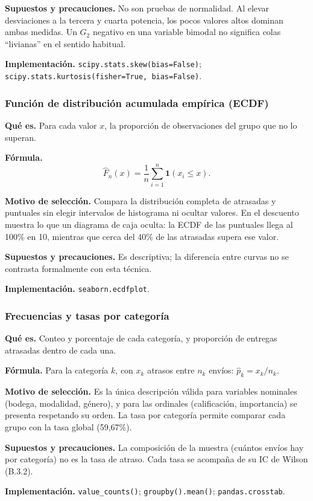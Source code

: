 \documentclass[10pt,a4paper]{article}
\begin{document}
\textbf{Supuestos y precauciones.} No son pruebas de normalidad. Al elevar desviaciones a la tercera y cuarta potencia, los pocos valores altos dominan ambas medidas. Un $G_2$ negativo en una variable bimodal no significa colas ``livianas'' en el sentido habitual.

\textbf{Implementación.} \texttt{scipy.stats.skew(bias=False)}; \texttt{scipy.stats.kurtosis(fisher=True, bias=False)}.

\subsubsection{Función de distribución acumulada empírica (ECDF)}
\textbf{Qué es.} Para cada valor $x$, la proporción de observaciones del grupo que no lo superan.

\textbf{Fórmula.}
\[
\hat F_n(x)=\frac1n\sum_{i=1}^{n}\mathbf 1(x_i\le x).
\]

\textbf{Motivo de selección.} Compara la distribución completa de atrasadas y puntuales sin elegir intervalos de histograma ni ocultar valores. En el descuento muestra lo que un diagrama de caja oculta: la ECDF de las puntuales llega al 100\% en 10, mientras que cerca del 40\% de las atrasadas supera ese valor.

\textbf{Supuestos y precauciones.} Es descriptiva; la diferencia entre curvas no se contrasta formalmente con esta técnica.

\textbf{Implementación.} \texttt{seaborn.ecdfplot}.

\subsubsection{Frecuencias y tasas por categoría}
\textbf{Qué es.} Conteo y porcentaje de cada categoría, y proporción de entregas atrasadas dentro de cada una.

\textbf{Fórmula.} Para la categoría $k$, con $x_k$ atrasos entre $n_k$ envíos: $\hat p_k=x_k/n_k$.

\textbf{Motivo de selección.} Es la única descripción válida para variables nominales (bodega, modalidad, género), y para las ordinales (calificación, importancia) se presenta respetando su orden. La tasa por categoría permite comparar cada grupo con la tasa global (59,67\%).

\textbf{Supuestos y precauciones.} La composición de la muestra (cuántos envíos hay por categoría) no es la tasa de atraso. Cada tasa se acompaña de su IC de Wilson (B.3.2).

\textbf{Implementación.} \texttt{value\_counts()}; \texttt{groupby().mean()}; \texttt{pandas.crosstab}.
\end{document}
